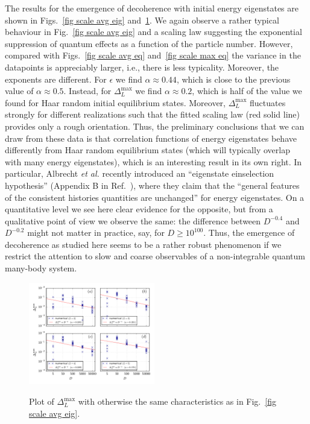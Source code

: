\documentclass[pre,onecolumn,12pt,aps,longbibliography,nofootinbib]{revtex4-2}
\newcommand{\blue}[1]{#1}
\newcommand{\new}[1]{#1}
\begin{document}
The results for the emergence of \new{decoherence} with initial energy eigenstates are shown in Figs.~\ref{fig scale avg eig} and~\ref{fig scale max eig}. We again observe a rather typical behaviour \blue{in Fig.~\ref{fig scale avg eig}} and a scaling law suggesting the exponential suppression of quantum effects as a function of the particle number. However, compared with Figs.~\ref{fig scale avg eq} and~\ref{fig scale max eq} the variance in the datapoints is appreciably larger, i.e., there is less typicality. Moreover, the exponents are different. For $\epsilon$ we find $\alpha \approx 0.44$, which is close to the previous value of $\alpha\approx0.5$. Instead, for $\Delta_L^\text{max}$ we find $\alpha\approx0.2$, which is half of the value we found for Haar random initial equilibrium states. \blue{Moreover, $\Delta_L^\text{max}$ fluctuates strongly for different realizations such that the fitted scaling law (red solid line) provides only a rough orientation. Thus,} the preliminary conclusions that we can draw from these data is that \new{correlation functions of} energy eigenstates behave differently from Haar random equilibrium states (which will typically overlap with many energy eigenstates)\new{, which is an interesting result in its own right. In particular, Albrecht \emph{et al.} recently introduced an ``eigenstate einselection hypothesis'' (Appendix B in Ref.~\cite{AlbrechtBaunachArrasmithPRD2022}), where they claim that the ``general features of the consistent histories quantities are unchanged'' for energy eigenstates. On a quantitative level we see here clear evidence for the opposite, but} from a qualitative point of view we observe the same: the difference between $D^{-0.4}$ and $D^{-0.2}$ might not matter in practice, say, for $D\ge 10^{100}$. Thus, the emergence of \new{decoherence} as studied here seems to be a rather robust phenomenon if we restrict the attention to slow and coarse observables of a non-integrable quantum many-body system.

\begin{figure}[t]
 \centering\includegraphics[width=0.49\textwidth,clip=true]{Max_001_eig.pdf}
 \label{fig scale max eig}\vspace{-0.5cm}
 \caption{Plot of $\Delta_L^\text{max}$ with otherwise the same characteristics as in Fig.~\ref{fig scale avg eig}. }
\end{figure}
\end{document}
